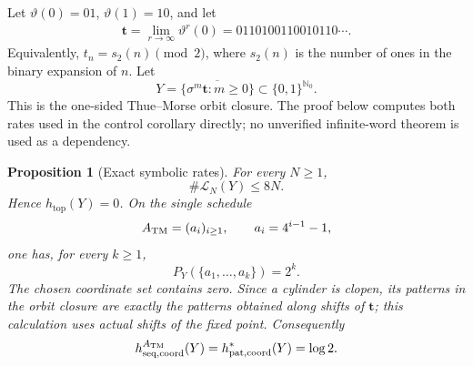 \documentclass[11pt,reqno]{amsart}
\numberwithin{equation}{section}
\newtheorem{proposition}[theorem]{Proposition}
\theoremstyle{definition}
\newcommand{\Nzero}{\mathbb N_0}
\newcommand{\Lcal}{\mathcal L}
\newcommand{\htop}{h_{\mathrm{top}}}
\begin{document}
Let $\vartheta(0)=01$, $\vartheta(1)=10$, and let
\begin{align*}
 \mathbf t=\lim_{r\to\infty}\vartheta^r(0)
 =0110100110010110\cdots.
\end{align*}
Equivalently, $t_n=s_2(n)\pmod2$, where $s_2(n)$ is the number of ones in
the binary expansion of $n$.  Let
\begin{equation}\label{eq:thue-morse-shift}
 Y=\overline{\{\sigma^m\mathbf t:m\ge0\}}
 \subset\{0,1\}^{\Nzero}.
\end{equation}
This is the one-sided Thue--Morse orbit closure.  The proof below computes both rates used in the control corollary
directly; no unverified infinite-word theorem is used as a dependency.

\begin{proposition}[Exact symbolic rates]\label{prop:thue-morse}
For every $N\ge1$,
\begin{equation}\label{eq:TM-linear}
 \#\Lcal_N(Y)\le8N.
\end{equation}
Hence $\htop(Y)=0$.  On the single schedule
\begin{equation}\label{eq:TM-schedule}
 A_{\rm TM}=(a_i)_{i\ge1},
 \qquad a_i=4^{i-1}-1,
\end{equation}
one has, for every $k\ge1$,
\begin{equation}\label{eq:TM-full-pattern}
 P_Y(\{a_1,\ldots,a_k\})=2^k.
\end{equation}
The chosen coordinate set contains zero.  Since a cylinder is clopen, its
patterns in the orbit closure are exactly the patterns obtained along shifts
of $\mathbf t$; this calculation uses actual shifts of the fixed point.  Consequently
\begin{equation}\label{eq:TM-complexities}
 h_{\rm seq,coord}^{A_{\rm TM}}(Y)
 =h_{\rm pat,coord}^*(Y)=\log2.
\end{equation}
\end{proposition}
\end{document}
